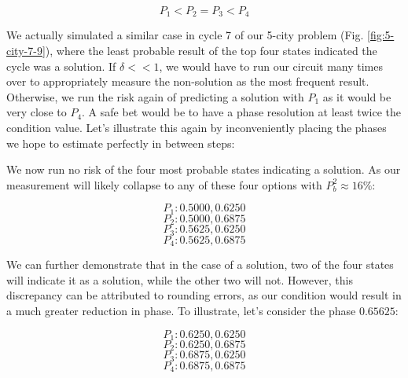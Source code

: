 \documentclass[msc,oneside]{ubcthesis}
\begin{document}
 $$P_1 < P_2 = P_3 < P_4$$
 
We actually simulated a similar case in cycle 7 of our 5-city problem (Fig. \ref{fig:5-city-7-9}), where the least probable result of the top four states indicated the cycle was a solution. If $\delta << 1$, we would have to run our circuit many times over to appropriately measure the non-solution as the most frequent result. Otherwise, we run the risk again of predicting a solution with $P_1$ as it would be very close to $P_4$. A safe bet would be to have a phase resolution at least twice the condition value. Let's illustrate this again by inconveniently placing the phases we hope to estimate perfectly in between steps:
 
 
 We now run no risk of the four most probable states indicating a solution. As our measurement will likely collapse to any of these four options with $P^2_b \approx 16\%$:
 
 $$P_1: 0.5000, 0.6250$$
 $$P_2: 0.5000, 0.6875$$
 $$P_3: 0.5625, 0.6250$$
 $$P_4: 0.5625, 0.6875$$
 
We can further demonstrate that in the case of a solution, two of the four states will indicate it as a solution, while the other two will not. However, this discrepancy can be attributed to rounding errors, as our condition would result in a much greater reduction in phase. To illustrate, let's consider the phase $0.65625$:



$$P_1: 0.6250, 0.6250$$
$$P_2: 0.6250, 0.6875$$
$$P_3: 0.6875, 0.6250$$
$$P_4: 0.6875, 0.6875$$
\end{document}
